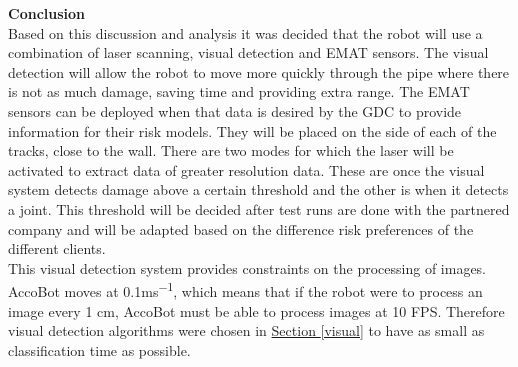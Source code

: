 \documentclass[11pt]{article}		%
\newcommand{\supercite}[1]{\textsuperscript{\cite{#1}}}		%
\newcommand{\sectref}[1]{\hyperref[#1]{Section \ref*{#1}}}     %
\begin{document}
	        \textbf{Conclusion}
	        \\
            Based on this discussion and analysis it was decided that the robot will use a combination of laser scanning, visual detection and EMAT sensors. The visual detection will allow the robot to move more quickly through the pipe where there is not as much damage, saving time and providing extra range. The EMAT sensors can be deployed when that data is desired by the GDC to provide information for their risk models. They will be placed on the side of each of the tracks, close to the wall. There are two modes for which the laser will be activated to extract data of greater resolution data. These are once the visual system detects damage above a certain threshold and the other is when it detects a joint. This threshold will be decided after test runs are done with the partnered company and will be adapted based on the difference risk preferences of the different clients.
            \\
            \hspace*{2ex}This visual detection system provides constraints on the processing of images. AccoBot moves at 0.1ms\textsuperscript{−1}, which means that if the robot were to process an image every 1 cm, AccoBot must be able to process images at 10 FPS. Therefore visual detection algorithms were chosen in \sectref{visual} to have as small as classification time as possible.
	        
	        
\end{document}
